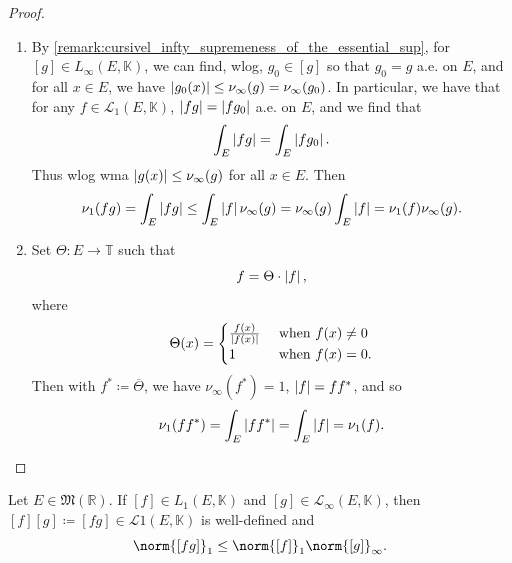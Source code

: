 \documentclass[notoc,notitlepage]{tufte-book}
\begin{document}
\begin{proof}
  \begin{enumerate}
    \item By \cref{remark:cursivel_infty_supremeness_of_the_essential_sup},
      for $[g] \in L_\infty(E, \mathbb{K})$, we can find, wlog, $g_0 \in [g]$ 
      so that $g_0 = g$ a.e. on $E$, and for all $x \in E$, we have
      $\left|g_0(x)\right| \leq \nu_{\infty}(g) = \nu_{\infty}(g_0)$.
      In particular, we have that for any $f \in \mathcal{L}_1(E, \mathbb{K})$,
      $\left|fg\right| = \left|fg_0\right|$ a.e. on $E$, and we find that
      \begin{equation*}
        \int_{E} \left|fg\right| = \int_{E} \left|fg_0\right|.
      \end{equation*}
      Thus wlog wma $\left|g(x)\right| \leq \nu_\infty(g)$ for all $x \in E$.
      Then
      \begin{equation*}
        \nu_1(fg) = \int_{E} \left|fg\right| \leq \int_{E} \left|f\right| \nu_\infty(g)
        = \nu_\infty(g) \int_{E} \left|f\right| = \nu_1(f) \nu_\infty(g).
      \end{equation*}

    \item Set $\Theta : E \to \mathbb{T}$ such that
      \begin{equation*}
        f = \Theta \cdot \left|f\right|,
      \end{equation*}
      where
      \begin{equation*}
        \Theta(x) = \begin{cases}
          \frac{f(x)}{\left|f(x)\right|} & \text{ when } f(x) \neq 0 \\
          1 & \text{ when } f(x) = 0.
        \end{cases}
      \end{equation*}
      Then with $f^* \coloneqq \overline{\Theta}$,
      we have $\nu_\infty(f^*) = 1$, $\left|f\right| = ff^*$, and so
      \begin{align*}
        \nu_1(ff^*) = \int_{E} \left|ff^*\right| = \int_{E} \left|f\right| = \nu_1(f).
      \end{align*}
  \end{enumerate}
\end{proof}

\begin{crly}\label{crly:holder_s_inequality_for_L_1_e_k_}
  Let $E \in \mathfrak{M}(\mathbb{R})$.
  If $[f] \in L_1(E, \mathbb{K})$ and
  $[g] \in \mathcal{L}_\infty(E, \mathbb{K})$,
  then $[f][g] \coloneqq [fg] \in \mathcal{L}1(E, \mathbb{K})$ is well-defined
  and
  \begin{equation*}
    \norm{[fg]}_1 \leq \norm{[f]}_1 \norm{[g]}_{\infty}.
  \end{equation*}
\end{crly}
\end{document}

